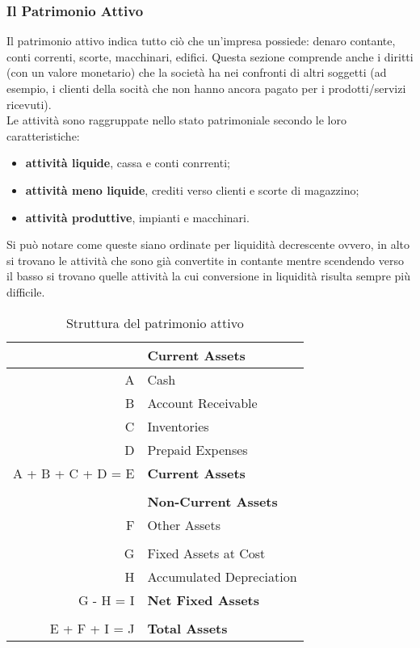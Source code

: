 \documentclass[a4paper,portrait,12pt]{article}
\theoremstyle{definition}
\begin{document}
\subsubsection{Il Patrimonio Attivo}

Il patrimonio attivo indica tutto ciò che un'impresa possiede: denaro contante, conti correnti, scorte, macchinari, edifici.
Questa sezione comprende anche i diritti (con un valore monetario) che la società ha nei confronti di altri soggetti (ad esempio, i clienti della socità che non hanno ancora pagato per i prodotti/servizi ricevuti).\\

Le attività sono raggruppate nello stato patrimoniale secondo le loro caratteristiche:
\begin{itemize}
\item \textbf{attività liquide}, cassa e conti conrrenti;
\item \textbf{attività meno liquide}, crediti verso clienti e scorte di magazzino;
\item \textbf{attività produttive}, impianti e macchinari.
\end{itemize}
Si può notare come queste siano ordinate per liquidità decrescente ovvero, in alto si trovano le attività che sono già convertite in contante mentre scendendo verso il basso si trovano quelle attività la cui conversione in liquidità risulta sempre più difficile.


\begin{table}[H]
\centering
\begin{tabular}{r|l}
 & \textbf{Current Assets}\\
\hline
A & Cash\\
B & Account Receivable\\
C & Inventories\\
D & Prepaid Expenses\\
\hline
A + B + C + D = E & \textbf{Current Assets}\\
 & \\
 & \textbf{Non-Current Assets}\\
\hline
F & Other Assets\\
 & \\
G & Fixed Assets at Cost\\
H & Accumulated Depreciation\\
\hline
G - H = I & \textbf{Net Fixed Assets}\\
 & \\
\hline
E + F + I = J & \textbf{Total Assets}\\
\hline
\end{tabular}
\caption{Struttura del patrimonio attivo}
\end{table}
\end{document}
